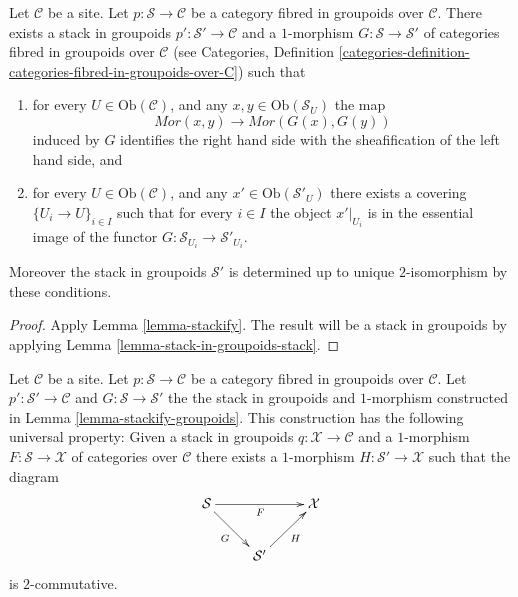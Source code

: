 \begin{lemma}
\label{lemma-stackify-groupoids}
Let $\mathcal{C}$ be a site.
Let $p : \mathcal{S} \to \mathcal{C}$ be a category
fibred in groupoids over $\mathcal{C}$.
There exists a stack in groupoids
$p' : \mathcal{S}' \to \mathcal{C}$ and a
$1$-morphism $G : \mathcal{S} \to \mathcal{S}'$
of categories fibred in groupoids over $\mathcal{C}$ (see
Categories, Definition
\ref{categories-definition-categories-fibred-in-groupoids-over-C})
such that
\begin{enumerate}
\item for every $U \in \text{Ob}(\mathcal{C})$, and any
$x, y \in \text{Ob}(\mathcal{S}_U)$ the map
$$
\mathit{Mor}(x, y) \longrightarrow \mathit{Mor}(G(x), G(y))
$$
induced by $G$ identifies the right hand side with the sheafification
of the left hand side, and
\item for every $U \in \text{Ob}(\mathcal{C})$, and any
$x' \in \text{Ob}(\mathcal{S}'_U)$ there exists a covering
$\{U_i \to U\}_{i \in I}$ such that for every $i \in I$ the
object $x'|_{U_i}$ is in the essential image of the
functor $G : \mathcal{S}_{U_i} \to \mathcal{S}'_{U_i}$.
\end{enumerate}
Moreover the stack in groupoids $\mathcal{S}'$ is determined up to unique
$2$-isomorphism by these conditions.
\end{lemma}

\begin{proof}
Apply Lemma \ref{lemma-stackify}. The result will be a
stack in groupoids by applying Lemma \ref{lemma-stack-in-groupoids-stack}.
\end{proof}

\begin{lemma}
\label{lemma-stackify-groupoids-universal-property}
Let $\mathcal{C}$ be a site.
Let $p : \mathcal{S} \to \mathcal{C}$ be a category fibred in groupoids
over $\mathcal{C}$. Let $p' : \mathcal{S}' \to \mathcal{C}$ and
$G : \mathcal{S} \to \mathcal{S}'$
the the stack in groupoids and $1$-morphism constructed in
Lemma \ref{lemma-stackify-groupoids}.
This construction has the following universal property: Given a stack
in groupoids $q : \mathcal{X} \to \mathcal{C}$ and a $1$-morphism
$F : \mathcal{S} \to \mathcal{X}$ of categories over $\mathcal{C}$
there exists a $1$-morphism $H : \mathcal{S}' \to \mathcal{X}$
such that the diagram
$$
\xymatrix{
\mathcal{S} \ar[rr]_F \ar[rd]_G & & \mathcal{X} \\
& \mathcal{S}' \ar[ru]_H
}
$$
is $2$-commutative.
\end{lemma}

